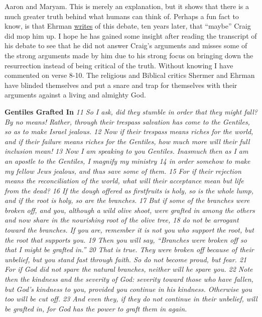 Aaron and Maryam. This is merely an explanation, but it shows that there
is a much greater truth behind what humans can think of. Perhaps a fun
fact to know, is that Ehrman
\href{https://ehrmanblog.org/ehrman-vs-craig-evidence-for-resurrection}{writes}
of this debate, ten years later, that ``maybe'' Craig did mop him up. I
hope he has gained some insight after reading the transcript of his
debate to see that he did not answer Craig's arguments and misses some
of the strong arguments made by him due to his strong focus on bringing
down the resurrection instead of being critical of the truth. Without
knowing I have commented on verse 8-10. The religious and Biblical
critics Shermer and Ehrman have blinded themselves and put a snare and
trap for themselves with their arguments against a living and almighty
God.

\textbf{Gentiles Grafted In} \emph{11 So I ask, did they stumble in
order that they might fall? By no means! Rather, through their trespass
salvation has come to the Gentiles, so as to make Israel jealous. 12 Now
if their trespass means riches for the world, and if their failure means
riches for the Gentiles, how much more will their full inclusion mean!}
\emph{13 Now I am speaking to you Gentiles. Inasmuch then as I am an
apostle to the Gentiles, I magnify my ministry 14 in order somehow to
make my fellow Jews jealous, and thus save some of them. 15 For if their
rejection means the reconciliation of the world, what will their
acceptance mean but life from the dead? 16 If the dough offered as
firstfruits is holy, so is the whole lump, and if the root is holy, so
are the branches.} \emph{17 But if some of the branches were broken off,
and you, although a wild olive shoot, were grafted in among the others
and now share in the nourishing root of the olive tree, 18 do not be
arrogant toward the branches. If you are, remember it is not you who
support the root, but the root that supports you. 19 Then you will say,
``Branches were broken off so that I might be grafted in.'' 20 That is
true. They were broken off because of their unbelief, but you stand fast
through faith. So do not become proud, but fear. 21 For if God did not
spare the natural branches, neither will he spare you. 22 Note then the
kindness and the severity of God: severity toward those who have fallen,
but God's kindness to you, provided you continue in his kindness.
Otherwise you too will be cut off. 23 And even they, if they do not
continue in their unbelief, will be grafted in, for God has the power to
graft them in again.}

